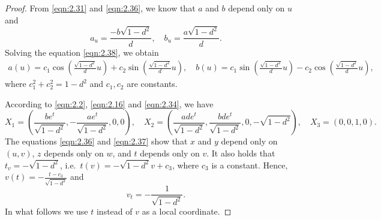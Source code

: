 \documentclass[10pt,a4paper]{amsart}
\begin{document}
\begin{proof}
		From \eqref{eqn:2.31} and \eqref{eqn:2.36}, we know
		that $a$ and $b$ depend only on $u$ and
		\begin{equation}\label{eqn:2.38}
			a_u=\frac{-b\sqrt{1-d^2}}{d}, \quad b_u=\frac{a\sqrt{1-d^2}}{d}.
		\end{equation}
		Solving the equation \eqref{eqn:2.38}, we obtain
		\begin{equation}\label{eqn:2.39}
			\begin{aligned}
				a(u)=c_1\cos\left(\tfrac{\sqrt{1-d^2}}{d}u\right)+c_2\sin\left(\tfrac{\sqrt{1-d^2}}{d}u\right), \quad
				b(u)=c_1\sin\left(\tfrac{\sqrt{1-d^2}}{d}u\right)-c_2\cos\left(\tfrac{\sqrt{1-d^2}}{d}u\right),
			\end{aligned}
		\end{equation}
		where $c_1^2+c_2^2=1-d^2$ and $c_1, c_2$ are constants.
		
		According to \eqref{eqn:2.2}, \eqref{eqn:2.16} and \eqref{eqn:2.34}, we have
		\begin{equation}\label{eqn:2.37}
			X_1= \left(\frac{be^t}{\sqrt{1-d^2}},-\frac{ae^t}{\sqrt{1-d^2}},0,0\right),\quad
			X_2= \left(\frac{ade^t}{\sqrt{1-d^2}},\frac{bde^t}{\sqrt{1-d^2}},0,-\sqrt{1-d^2}\right),\quad
			X_3= \left(0,0,1,0\right).
		\end{equation}
		The equations \eqref{eqn:2.36} and \eqref{eqn:2.37} show that
		$x$ and $y$ depend only on $(u,v)$, $z$ depends only on $w$,
		and $t$ depends only on $v$.
		It also holds that $t_v=-\sqrt{1-d^2}$, i.e.\ $t(v)=-\sqrt{1-d^2}v+c_3$, where $c_3$ is a constant.
		Hence, $v(t)=-\tfrac{t-c_3}{\sqrt{1-d^2}}$ and
		\begin{equation}\label{eqn:2.40}
			v_t=-\frac{1}{\sqrt{1-d^2}}.
		\end{equation}
		In what follows we use $t$ instead of $v$ as a local coordinate.
		

\end{proof}
\end{document}
